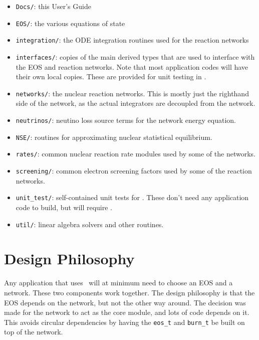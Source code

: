 \begin{itemize}
\item {\tt Docs/}: this User's Guide

\item {\tt EOS/}: the various equations of state

\item {\tt integration/}: the ODE integration routines used for the
  reaction networks

\item {\tt interfaces/}: copies of the main derived types that are used to
  interface with the EOS and reaction networks.  Note that most application
  codes will have their own local copies.  These are provided for unit testing
  in \microphysics.

\item {\tt networks/}: the nuclear reaction networks.  This is mostly just the
  righthand side of the network, as the actual integrators are decoupled from
  the network.

\item {\tt neutrinos/}: neutino loss source terms for the network energy equation.

\item {\tt NSE/}: routines for approximating nuclear statistical equilibrium.

\item {\tt rates/}: common nuclear reaction rate modules used by some of the 
  networks.

\item {\tt screening/}: common electron screening factors used by some of the 
  reaction networks.

\item {\tt unit\_test/}: self-contained unit tests for \microphysics.  These don't
  need any application code to build, but will require \boxlib.

\item {\tt util/}: linear algebra solvers and other routines.

\end{itemize}



\section{Design Philosophy}

Any application that uses \microphysics\ will at minimum need to
choose an EOS and a network.  These two components work together.  The
design philosophy is that the EOS depends on the network, but not the
other way around.  The decision was made for the network to act as the
core module, and lots of code depends on it.  This avoids circular
dependencies by having the {\tt eos\_t} and {\tt burn\_t} be built on
top of the network.

